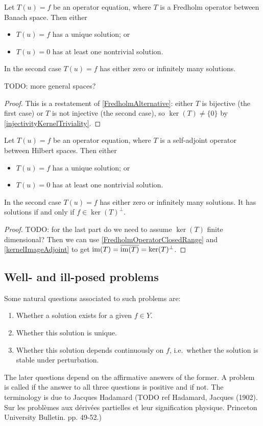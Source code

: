 \begin{proposition}
Let $T(u) = f$ be an operator equation, where $T$ is a Fredholm operator between Banach space. Then either
\begin{itemize}
\item $T(u) = f$ has a unique solution; or
\item $T(u) = 0$ has at least one nontrivial solution.
\end{itemize}
In the second case $T(u) = f$ has either zero or infinitely many solutions.
\end{proposition}
TODO: more general spaces?
\begin{proof}
This is a restatement of \ref{FredholmAlternative}: either $T$ is bijective (the first case) or $T$ is not injective (the second case), so $\ker(T) \neq \{0\}$ by \ref{injectivityKernelTriviality}.
\end{proof}
\begin{corollary}
Let $T(u) = f$ be an operator equation, where $T$ is a self-adjoint operator between Hilbert spaces. Then either
\begin{itemize}
\item $T(u) = f$ has a unique solution; or
\item $T(u) = 0$ has at least one nontrivial solution.
\end{itemize}
In the second case $T(u) = f$ has either zero or infinitely many solutions. It has solutions \textup{if and only if} $f\in \ker(T)^\perp$.
\end{corollary}
\begin{proof}
TODO: for the last part do we need to assume $\ker(T)$ finite dimensional? Then we can use \ref{FredholmOperatorClosedRange} and \ref{kernelImageAdjoint} to get $\operatorname{im}(T) = \overline{\operatorname{im}(T)} = \ker(T)^\perp$.
\end{proof}

\subsection{Well- and ill-posed problems}
Some natural questions associated to such problems are:
\begin{enumerate}
\item Whether a solution exists for a given $f\in Y$.
\item Whether this solution is unique.
\item Whether this solution depends continuously on $f$, i.e.\ whether the solution is stable under perturbation.
\end{enumerate}
The later questions depend on the affirmative answers of the former. A problem is called  if the answer to all three questions is positive and  if not. The terminology is due to Jacques Hadamard (TODO ref Hadamard, Jacques (1902). Sur les problèmes aux dérivées partielles et leur signification physique. Princeton University Bulletin. pp. 49-52.)

